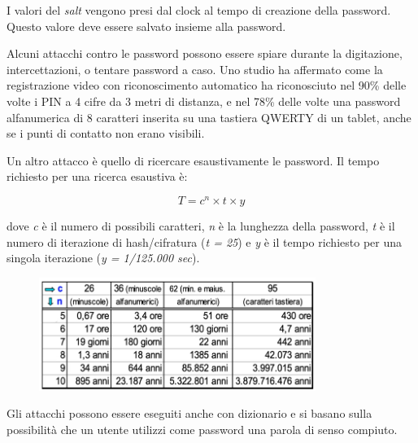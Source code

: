 I valori del \textit{salt} vengono presi dal clock al tempo di creazione della password. Questo valore deve essere salvato insieme alla password.

Alcuni attacchi contro le password possono essere spiare durante la digitazione, intercettazioni, o tentare password a caso. Uno studio ha affermato come la registrazione video con riconoscimento automatico ha riconosciuto nel 90\% delle volte i PIN a 4 cifre da 3 metri di distanza, e nel 78\% delle volte una password alfanumerica di 8 caratteri inserita su una tastiera QWERTY di un tablet, anche se i punti di contatto non erano visibili. 

Un altro attacco è quello di ricercare esaustivamente le password. Il tempo richiesto per una ricerca esaustiva è:

\[T= c^{n} \times t \times y\]

dove \textit{c} è il numero di possibili caratteri, \textit{n} è la lunghezza della password, \textit{t} è il numero di iterazione di hash/cifratura (\textit{t = 25}) e \textit{y} è il tempo richiesto per una singola iterazione (\textit{y = 1/125.000 sec}).

\begin{figure}[htb!]
    \centering
    \includegraphics[width=9cm]{./Images/cap1/1.57.png}
\end{figure} 

Gli attacchi possono essere eseguiti anche con dizionario e si basano sulla possibilità che un utente utilizzi come password una parola di senso compiuto. 

